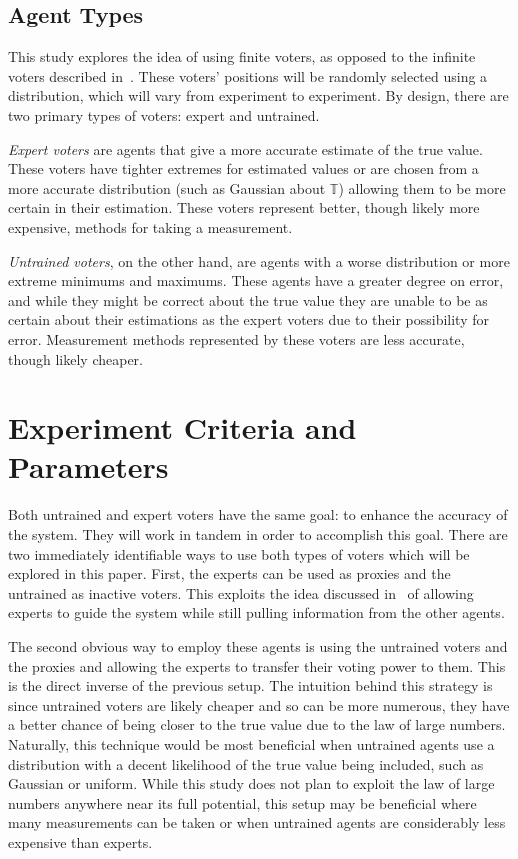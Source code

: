 \subsection{Agent Types}\label{subsec:agent-types}
This study explores the idea of using finite voters, as opposed to the
infinite voters described in~\cite{Cohensius2017}.
These voters' positions will be randomly selected using a distribution, which
will vary from experiment to experiment.
By design, there are two primary types of voters: expert and untrained.

\textit{Expert voters} are agents that give a more accurate estimate of the
true value.
These voters have tighter extremes for estimated values or are chosen from
a more accurate distribution (such as Gaussian about $\mathbb{T}$) allowing
them to be more certain in their estimation.
These voters represent better, though likely more expensive, methods for
taking a measurement.  %

\textit{Untrained voters}, on the other hand, are agents with a worse
distribution or more extreme minimums and maximums.
These agents have a greater degree on error, and while they might be correct
about the true value they are unable to be as certain about their estimations
as the expert voters due to their possibility for error.
Measurement methods represented by these voters are less accurate, though
likely cheaper.  %



\section{Experiment Criteria and Parameters}\label{sec:experiment-criteria
-and-parameters}
Both untrained and expert voters have the same goal: to enhance the accuracy of
the system.
They will work in tandem in order to accomplish this goal.
There are two immediately identifiable ways to use both types of voters which
will be explored in this paper.
First, the experts can be used as proxies and the untrained as inactive voters.
This exploits the idea discussed in~\cite{Miller1969, Mueller1972} of
allowing experts to guide the system while still pulling information from the
other agents.

The second obvious way to employ these agents is using the untrained voters
and the proxies and allowing the experts to transfer their voting power to them.
This is the direct inverse of the previous setup.
The intuition behind this strategy is since untrained voters are likely
cheaper and so can be more numerous, they have a better chance of being closer
to the true value due to the law of large numbers.
Naturally, this technique would be most beneficial when untrained agents use a
distribution with a decent likelihood of the true value being included, such
as Gaussian or uniform.
While this study does not plan to exploit the law of large numbers anywhere
near its full potential, this setup may be beneficial where many measurements
can be taken or when untrained agents are considerably less expensive than
experts.


